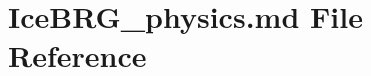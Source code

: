 \hypertarget{IceBRG__physics_8md}{}\section{Ice\+B\+R\+G\+\_\+physics.\+md File Reference}
\label{IceBRG__physics_8md}
